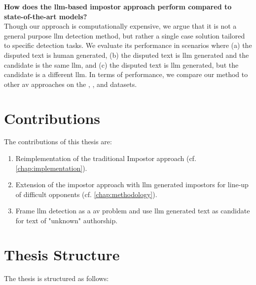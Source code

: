 \begin{questions}

    \item \textbf{How does the \ac{llm}-based impostor approach perform compared to state-of-the-art models?} \label{enum:rq4} \hfill \\
    Though our approach is computationally expensive, we argue that it is not a general purpose \ac{llm} detection method, but rather a single case solution tailored to specific detection tasks.
    We evaluate its performance in scenarios where (a) the disputed text is human generated,
    (b) the disputed text is \ac{llm} generated and the candidate is the same \ac{llm}, and
    (c) the disputed text is \ac{llm} generated, but the candidate is a different \ac{llm}.
    In terms of performance, we compare our method to other \ac{av} approaches on the \dataStudent{}, \dataBlog{}, \dataGutenberg{} and \dataPan{} datasets.
    
\end{questions}





\section{Contributions}
\label{sec:contributions}
The contributions of this thesis are:
\begin{enumerate}
    \item Reimplementation of the traditional Impostor approach (cf. \autoref{chap:implementation}).
    \item Extension of the impostor approach with \ac{llm} generated impostors for line-up of difficult opponents (cf. \autoref{chap:methodology}). 
    \item Frame \ac{llm} detection as a \ac{av} problem and use \ac{llm} generated text as candidate for text of "unknown" authorship.
\end{enumerate}


\section{Thesis Structure}
\label{sec:thesis_structure}
The thesis is structured as follows: